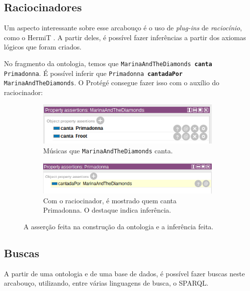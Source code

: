 \subsection{Raciocinadores}

Um aspecto interessante sobre esse arcabouço é o uso de \textit{plug-ins} de \textit{raciocínio}, como o HermiT \cite{ferramentasHermit}. A partir deles, é possível fazer inferências a partir dos axiomas lógicos que foram criados.

No fragmento da ontologia, temos que \texttt{MarinaAndTheDiamonds \textbf{canta} Primadonna}. É possível inferir que \texttt{Primadonna \textbf{cantadaPor} MarinaAndTheDiamonds}. O Protégé consegue fazer isso com o auxílio do raciocinador:

\begin{figure}[H]
	\centering
	\begin{subfigure}{.5\textwidth}
		\centering
		\includegraphics[width=0.9\linewidth]{Capitulos/Ferramentas/marinacanta}
		\caption{Músicas que \texttt{MarinaAndTheDiamonds} canta.}
	\end{subfigure}%
	\begin{subfigure}{.5\textwidth}
		\centering
		\includegraphics[width=0.95\linewidth]{Capitulos/Ferramentas/inferencia}
		\caption{Com o raciocinador, é mostrado quem canta Primadonna. O destaque indica inferência.}
	\end{subfigure}
	\caption{A asserção feita na construção da ontologia e a inferência feita.}
\end{figure}

\subsection{Buscas}

A partir de uma ontologia e de uma base de dados, é possível fazer buscas neste arcabouço, utilizando, entre várias linguagens de busca, o SPARQL.

